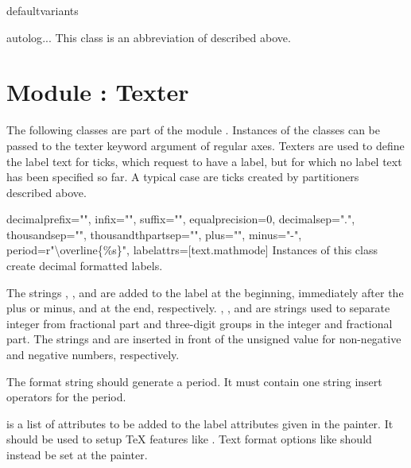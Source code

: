 \begin{memberdesc}{defaultvariants}
\end{memberdesc}

\begin{classdesc}{autolog}{...}
This class is an abbreviation of  described above.
\end{classdesc} %

\section{Module : Texter} %


The following classes are part of the module .
Instances of the classes can be passed to the texter keyword argument
of regular axes. Texters are used to define the label text for ticks,
which request to have a label, but for which no label text has been specified
so far. A typical case are ticks created by partitioners described
above.

\begin{classdesc}{decimal}{prefix="", infix="", suffix="", equalprecision=0,
                           decimalsep=".", thousandsep="", thousandthpartsep="",
                           plus="", minus="-", period=r"\textbackslash overline\{\%s\}",
                           labelattrs=[text.mathmode]}
  Instances of this class create decimal formatted labels.

  The strings , , and  are added to
  the label at the beginning, immediately after the plus or minus, and at
  the end, respectively. , , and
   are strings used to separate integer from
  fractional part and three-digit groups in the integer and fractional
  part. The strings  and  are inserted in front
  of the unsigned value for non-negative and negative numbers,
  respectively.

  The format string  should generate a period. It must
  contain one string insert operators  for the period.

   is a list of attributes to be added to the label
  attributes given in the painter. It should be used to setup \TeX{}
  features like . Text format options like
   should instead be set at the painter.
\end{classdesc}


